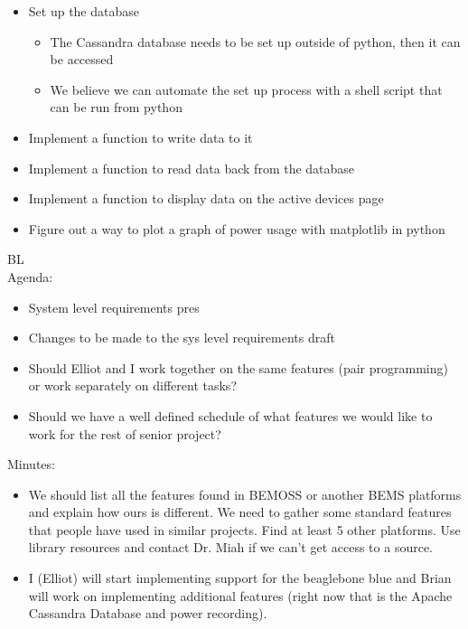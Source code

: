 \documentclass[fontsize=11pt, %
                             paper=letter, %
                             openany, %
                             captions=tableheading,
                             index=totoc,
                             hyperref]{labbook}
\begin{document}
\begin{itemize}
\item Set up the database
	\begin{itemize}
	\item The Cassandra database needs to be set up outside of python, then it can be accessed
	\item We believe we can automate the set up process with a shell script that can be run from python
	\end{itemize}
\item Implement a function to write data to it 
\item Implement a function to read data back from the database
\item Implement a function to display data on the active devices page
\item Figure out a way to plot a graph of power usage with matplotlib in python
\end{itemize}

BL\\
Agenda:
\begin{itemize}
\item System level requirements pres
\item Changes to be made to the sys level requirements draft
\item Should Elliot and I work together on the same features (pair programming) or work separately on different tasks?
\item Should we have a well defined schedule of what features we would like to work for the rest of senior project?
\end{itemize}

Minutes:
\begin{itemize}
\item We should list all the features found in BEMOSS or another BEMS platforms and explain how ours is different. We need to gather some standard features that people have used in similar projects. Find at least 5 other platforms. Use library resources and contact Dr. Miah if we can't get access to a source.
\item I (Elliot) will start implementing support for the beaglebone blue and Brian will work on implementing additional features (right now that is the Apache Cassandra Database and power recording).
\end{itemize}
\end{document}
